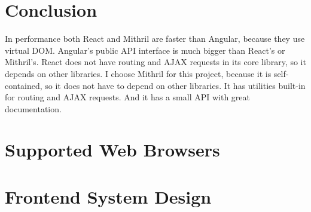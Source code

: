 \section{Conclusion}
In performance both React and Mithril are faster than Angular, because they use virtual DOM. Angular's public API interface is much bigger than React's or Mithril's. React does not have routing and AJAX requests in its core library, so it depends on other libraries. 
I choose Mithril for this project, because it is  self-contained, so it does not have to depend on other libraries. It has utilities built-in for routing and AJAX requests. And it has a small API with great documentation. 



\section{Supported Web Browsers}


\section{Frontend System Design}
\label{frontend-system-design}
